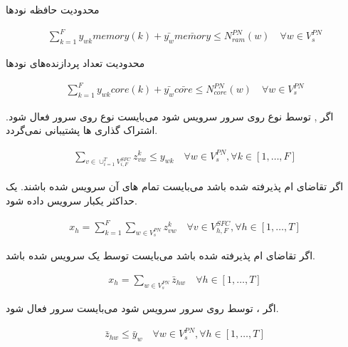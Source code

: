 محدودیت حافظه نودها
\begin{latin}\begin{align}
    \sum_{k=1}^F y_{wk} memory(k) + \bar{y_w} \bar{memory} \le N_{ram}^{PN}(w)
    \quad
    \forall w \in V_s^{PN}
\end{align}\end{latin}

محدودیت تعداد پردازنده‌های نودها
\begin{latin}\begin{align}
    \sum_{k=1}^F y_{wk} core(k) + \bar{y_w} \bar{core} \le N_{core}^{PN}(w)
    \quad
    \forall w \in V_s^{PN}
\end{align}\end{latin}

اگر , 
توسط  نوع 
روی سرور  سرویس شود می‌بایست
 نوع 
روی سرور  فعال شود.
اشتراک گذاری ها پشتیبانی نمی‌گردد.
\begin{latin}\begin{align}
\sum_{v \in \cup_{i=1}^T V_{i, F}^{SFC}} z_{vw}^k \le y_{wk}
\quad
\forall w \in V_s^{PN}, \forall k \in [1,\ldots, F]
\end{align}\end{latin}

اگر تقاضای ام پذیرفته شده باشد
می‌بایست تمام های آن‌
سرویس شده باشند.
یک  حداکثر یکبار سرویس داده شود.
\begin{latin}\begin{align}
    x_h = \sum_{k=1}^{F} \sum_{w \in V_{s}^{PN}} z_{vw}^{k}
    \quad
    \forall v \in V_{h,F}^{SFC}, \forall h \in [1,\ldots, T]
\end{align}\end{latin}

اگر تقاضای ام پذیرفته شده باشد
می‌بایست توسط یک  سرویس شده باشد.
\begin{latin}\begin{align}
    x_h = \sum_{w \in V_{s}^{PN}} \bar{z}_{hw}
    \quad
    \forall h \in [1,\ldots, T]
\end{align}\end{latin}

اگر ، 
توسط  روی سرور 
سرویس شود می‌بایست  سرور 
فعال شود.
\begin{latin}\begin{align}
    \bar{z}_{hw} \le \bar{y}_w
    \quad
    \forall w \in V_{s}^{PN}, \forall h \in [1,\ldots, T]
\end{align}\end{latin}

